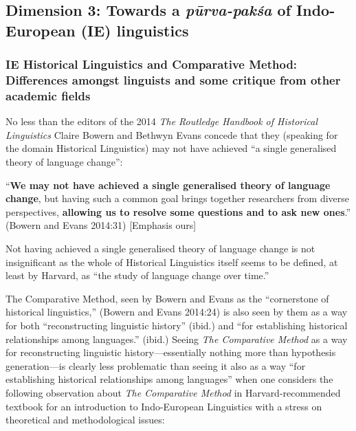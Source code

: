 \newpage


\subsection{Dimension 3: Towards a \textit{pūrva-pakśa} of Indo-European (IE) linguistics}

\subsubsection{IE Historical Linguistics and Comparative Method: Differences amongst linguists and some critique from other academic fields}

No less than the editors of the 2014 \textit{The Routledge Handbook of Historical Linguistics} Claire Bowern and Bethwyn Evans concede that they (speaking for the domain Historical Linguistics) may not have achieved “a single generalised theory of language change”:

\begin{myquote}
“\textbf{We may not have achieved a single generalised theory of language change}, but having such a common goal brings together researchers from diverse perspectives, \textbf{allowing us to resolve some questions and to ask new ones}.” \hfill (Bowern and Evans 2014:31) [Emphasis ours]
\end{myquote}

Not having achieved a single generalised theory of language change is not insignificant as the whole of Historical Linguistics itself seems to be defined, at least by Harvard, as “the study of language change over time.”

The Comparative Method, seen by Bowern and Evans as the “cornerstone of historical linguistics,” (Bowern and Evans 2014:24) is also seen by them as a way for both “reconstructing linguistic history” (ibid.) and “for establishing historical relationships among languages.” (ibid.) Seeing \textit{The Comparative Method} as a way for reconstructing linguistic history—essentially nothing more than hypothesis generation—is clearly less problematic than seeing it also as a way “for establishing historical relationships among languages” when one considers the following observation about \textit{The Comparative Method} in Harvard-recommended textbook for an introduction to Indo-European Linguistics with a stress on theoretical and methodological issues:

